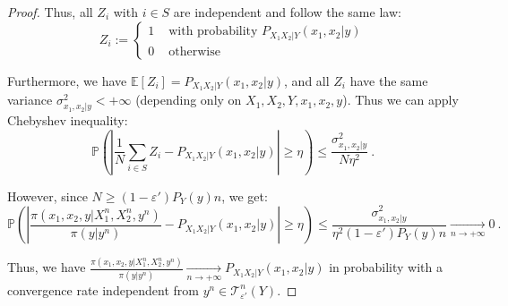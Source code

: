 \begin{proof}
        Thus, all $Z_i$ with $i \in S$ are independent and follow the same law:      
          \[ Z_i := \begin{cases}
            1 & \text{ with probability } P_{X_1X_2|Y}(x_1,x_2|y) \\
            0 & \text{ otherwise}
          \end{cases}
          \]


          Furthermore, we have $\mathbb{E}[Z_i] = P_{X_1X_2|Y}(x_1,x_2|y)$, and all $Z_i$ have the same variance $\sigma_{x_1,x_2|y}^2 < +\infty$ (depending only on $X_1,X_2,Y,x_1,x_2,y$). Thus we can apply Chebyshev inequality:
          \[ \mathbb{P}\left( \left|\frac{1}{N}\sum_{i \in S} Z_i - P_{X_1X_2|Y}(x_1,x_2|y) \right| \geq \eta \right) \leq \frac{\sigma_{x_1,x_2|y}^2}{N\eta^2} \ .\]

          However, since $N \geq (1-\varepsilon')P_Y(y)n$, we get:
          \[ \mathbb{P}\left( \left|\frac{\pi(x_1,x_2,y|X_1^n,X_2^n,y^n)}{\pi(y|y^n)} - P_{X_1X_2|Y}(x_1,x_2|y) \right| \geq \eta \right) \leq \frac{\sigma_{x_1,x_2|y}^2}{\eta^2(1-\varepsilon')P_Y(y)n} \underset{n \rightarrow +\infty}{\rightarrow} 0 \ .\]

          Thus, we have $\frac{\pi(x_1,x_2,y|X_1^n,X_2^n,y^n)}{\pi(y|y^n)} \underset{n \rightarrow +\infty}{\rightarrow} P_{X_1X_2|Y}(x_1,x_2|y)$ in probability with a convergence rate independent from $y^n \in \mathcal{T}^n_{\varepsilon'}(Y)$.
      \end{proof}

